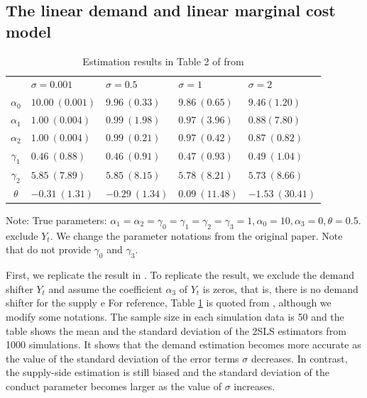 \documentclass[11pt, a4paper]{article}
\begin{document}
\subsection{The linear demand and linear marginal cost model}

\begin{table}[!htbp]
    \caption{Estimation results in Table 2 of from \cite{perloff2012collinearity}}
    \label{tb:linear_linear_sigma_Perloff_Shen}
    \begin{center}
        \begin{tabular}{cllll}
            \hline
            & $\sigma=0.001$ & $\sigma=0.5$ & $\sigma=1$ & $\sigma=2$ \\
            $\alpha_0$ & $10.00\ (0.001)$ & $9.96\ (0.33)$ & $9.86\ (0.65)$ & $9.46(1.20)$ \\
            $\alpha_1$ & $1.00\ (0.004)$ & $0.99\ (1.98)$ & $0.97\ (3.96)$ & $0.88(7.80)$ \\
            $\alpha_2$ & $1.00\ (0.004)$ & $0.99\ (0.21)$ & $0.97\ (0.42)$ & $0.87\ (0.82)$ \\
            $\gamma_1$ & $0.46\ (0.88)$ & $0.46\ (0.91)$ & $0.47\ (0.93)$ & $0.49\ (1.04)$ \\
            $\gamma_2$ & $5.85\ (7.89)$ & $5.85\ (8.15)$ & $5.78\ (8.21)$ & $5.73\ (8.66)$ \\
            $\theta$ & $-0.31\ (1.31)$ & $-0.29\ (1.34)$ & $0.09\ (11.48)$ & $-1.53\ (30.41)$ \\
            \hline
        \end{tabular}
    \end{center}\footnotesize
    Note: True parameters: $\alpha_1 = \alpha_2 = \gamma_0 = \gamma_1 = \gamma_2  = \gamma_3 = 1, \alpha_0 = 10, \alpha_3 = 0,  \theta = 0.5$. \citet{perloff2012collinearity} exclude $Y_t$. We change the parameter notations from the original paper. Note that \cite{perloff2012collinearity} do not provide $\gamma_0$ and $\gamma_3$.
\end{table}

First, we replicate the result in \citet{perloff2012collinearity}.
To replicate the result, we exclude the demand shifter $Y_t$ and assume the coefficient $\alpha_3$ of $Y_t$ is zeros, that is, there is no demand shifter for the supply e
For reference, Table \ref{tb:linear_linear_sigma_Perloff_Shen} is quoted from \cite{perloff2012collinearity}, although we modify some notations.
The sample size in each simulation data is 50 and the table shows the mean and the standard deviation of the 2SLS estimators from 1000 simulations.
It shows that the demand estimation becomes more accurate as the value of the standard deviation of the error terms $\sigma$ decreases.
In contrast, the supply-side estimation is still biased and the standard deviation of the conduct parameter becomes larger as the value of $\sigma$ increases.
\end{document}
